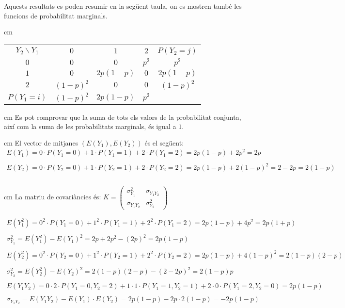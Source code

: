\documentclass{article}
\begin{document}
\noindent
Aquests resultats es poden resumir en la seg\"uent taula, on es mostren tamb\'e les funcions de
probabilitat marginals.

 cm
\begin{center}
\begin{tabular}{c|c|c|c||c}
$Y_2 \backslash Y_1$ & $0$ & $1$ & $2$ & $P(Y_2=j)$ \\ \hline
$0$ & $0$ & $0$ & $p^2$ & $p^2$ \\ \hline
$1$ & $0$ & $2p(1-p)$ & $0$ & $2p(1-p)$ \\ \hline
$2$ & $(1-p)^2$ & $0$ & $0$ & $(1-p)^2$ \\ \hline \hline
$P(Y_1=i)$ & $(1-p)^2$ & $2p(1-p)$ & $p^2$ 
\end{tabular} 
\end{center}

 cm
\noindent
Es pot comprovar que la suma de tots els valors de la probabilitat conjunta, aix\'i com
la suma de les probabilitats marginals, \'es igual a $1$.

 cm
\noindent
El vector de mitjanes $(E(Y_1), E(Y_2))$ \'es el seg\"uent:
\[
\begin{array}{l}
E(Y_1)=0 \cdot P(Y_1=0) + 1 \cdot P(Y_1=1) + 2 \cdot P(Y_1=2)=2p(1-p)+2p^2=2p \\ \\
E(Y_2)=0 \cdot P(Y_2=0) + 1 \cdot P(Y_2=1) + 2 \cdot P(Y_2=2)=2p(1-p)+2(1-p)^2=2-2p=2(1-p) \\ \\
\end{array}
\]

 cm
\noindent
La matriu de covari\`ancies \'es: $K = \begin{pmatrix} \sigma_{Y_1}^2 & \sigma_{Y_1 Y_2} \\ \sigma_{Y_1 Y_2} & \sigma_{Y_2}^2 \end{pmatrix}$

\[
\begin{array}{l}
E(Y_1^2)=0^2 \cdot P(Y_1=0) + 1^2 \cdot P(Y_1=1) + 2^2 \cdot P(Y_1=2)=2p(1-p)+4p^2=2p(1+p) \\ \\
\sigma_{Y_1}^2=E(Y_1^2)-E(Y_1)^2= 2p+2p^2 - (2p)^2=2p(1-p) \\ \\
E(Y_2^2)=0^2 \cdot P(Y_2=0) + 1^2 \cdot P(Y_2=1) + 2^2 \cdot P(Y_2=2)=2p(1-p)+4(1-p)^2=2(1-p)(2-p) \\ \\
\sigma_{Y_2}^2=E(Y_2^2)-E(Y_2)^2=  2(1-p)(2-p) - (2-2p)^2 = 2(1-p)p\\ \\
E(Y_1Y_2)=0 \cdot 2 \cdot P(Y_1=0, Y_2=2) +  1 \cdot 1 \cdot P(Y_1=1, Y_2=1) + 2 \cdot 0 \cdot P(Y_1=2, Y_2=0)=2p(1-p) \\ \\
\sigma_{Y_1 Y_2}=E(Y_1Y_2) - E(Y_1) \cdot E(Y_2) = 2p(1-p) - 2p \cdot 2(1-p) = -2p(1-p)
\end{array}
\]
\end{document}
